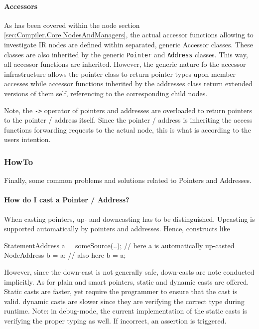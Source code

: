 \paragraph{Accessors}
As has been covered within the node section
\ref{sec:Compiler.Core.NodesAndManagers}, the actual accessor functions allowing
to investigate IR nodes are defined within separated, generic Accessor classes.
These classes are also inherited by the generic \texttt{Pointer} and
\texttt{Address} classes. This way, all accessor functions are inherited.
However, the generic nature fo the accessor infrastructure allows the pointer
class to return pointer types upon member accesses while accessor functions
inherited by the addresses class return extended versions of them self,
referencing to the corresponding child nodes.

Note, the \lstinline|->| operator of pointers and addresses are overloaded to
return pointers to the pointer / address itself. Since the pointer / address is
inheriting the access functions forwarding requests to the actual node, this is
what is according to the users intention.

\subsubsection{HowTo}
Finally, some common problems and solutions related to Pointers and Addresses.

\paragraph{How do I cast a Pointer / Address?}
When casting pointers, up- and downcasting has to be distinguished. Upcasting is
supported automatically by pointers and addresses. Hence, constructs like
\begin{insCode}
	StatementAddress a = someSource(..);
	// here a is automatically up-casted
	NodeAddress b = a;
	// also here
	b = a;
\end{insCode}

However, since the down-cast is not generally safe, down-casts are note
conducted implicitly. As for plain and smart pointers, static and dynamic casts
are offered. Static casts are faster, yet require the programmer to ensure that
the cast is valid. dynamic casts are slower since they are verifying the correct
type during runtime. Note: in debug-mode, the current implementation of the
static casts is verifying the proper typing as well. If incorrect, an assertion
is triggered.

